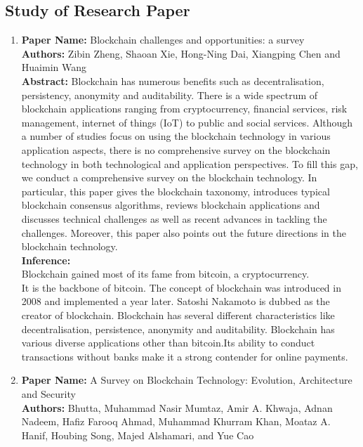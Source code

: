 \documentclass[oneside, 12pt]{book}
\begin{document}
		\subsection{Study of Research Paper}
			\begin{enumerate}
				\item
					\textbf{Paper Name:} Blockchain challenges and opportunities: a survey \cite{zheng2018blockchain}\\
					\textbf{Authors:} Zibin Zheng, Shaoan Xie, Hong-Ning Dai, Xiangping Chen and Huaimin Wang\\
					\textbf{Abstract:} Blockchain has numerous benefits such as decentralisation, persistency, anonymity and auditability. There is a wide spectrum of blockchain applications ranging from cryptocurrency, financial services, risk management, internet of things (IoT) to public and social services. Although a number of studies focus on using the blockchain technology in various application aspects, there is no comprehensive survey on the blockchain technology in both technological and application perspectives. To fill this gap, we conduct a comprehensive survey on the blockchain technology. In particular, this paper gives the blockchain taxonomy, introduces typical blockchain consensus algorithms, reviews blockchain applications and discusses technical challenges as well as recent advances in tackling the challenges. Moreover, this paper also points out the future directions in the blockchain technology.\\
					\textbf{Inference:}
					\\Blockchain gained most of its fame from bitcoin, a cryptocurrency.
					\\It is the backbone of bitcoin. The concept of blockchain was introduced in 2008 and implemented a year later. Satoshi Nakamoto is dubbed as the creator of blockchain. Blockchain has several different characteristics like decentralisation, persistence, anonymity and auditability. Blockchain has various diverse applications other than bitcoin.Its ability to conduct transactions without banks make it a strong contender for online payments.
				\item
					\textbf{Paper Name:} A Survey on Blockchain Technology: Evolution, Architecture and Security \cite{bhutta2021survey}\\
					\textbf{Authors:} Bhutta, Muhammad Nasir Mumtaz, Amir A. Khwaja, Adnan Nadeem, Hafiz Farooq Ahmad, Muhammad Khurram Khan, Moataz A. Hanif, Houbing Song, Majed Alshamari, and Yue Cao\\

\end{enumerate}
\end{document}
